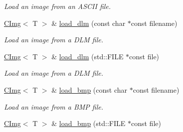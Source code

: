 \begin{DoxyCompactItemize}
\begin{DoxyCompactList}\small\item\em Load an image from an ASCII file. \item\end{DoxyCompactList}\item 
\hypertarget{structcimg__library_1_1CImg_a15505951824c019f6fdea4f0eaab8cac}{
\hyperlink{structcimg__library_1_1CImg}{CImg}$<$ T $>$ \& \hyperlink{structcimg__library_1_1CImg_a15505951824c019f6fdea4f0eaab8cac}{load\_\-dlm} (const char $\ast$const filename)}
\label{structcimg__library_1_1CImg_a15505951824c019f6fdea4f0eaab8cac}

\begin{DoxyCompactList}\small\item\em Load an image from a DLM file. \item\end{DoxyCompactList}\item 
\hypertarget{structcimg__library_1_1CImg_a29d964f1e7f6e72bd8838ea5e89e0c3e}{
\hyperlink{structcimg__library_1_1CImg}{CImg}$<$ T $>$ \& \hyperlink{structcimg__library_1_1CImg_a29d964f1e7f6e72bd8838ea5e89e0c3e}{load\_\-dlm} (std::FILE $\ast$const file)}
\label{structcimg__library_1_1CImg_a29d964f1e7f6e72bd8838ea5e89e0c3e}

\begin{DoxyCompactList}\small\item\em Load an image from a DLM file. \item\end{DoxyCompactList}\item 
\hypertarget{structcimg__library_1_1CImg_abd7e94f200f3d4bd249c32d0d9c511bc}{
\hyperlink{structcimg__library_1_1CImg}{CImg}$<$ T $>$ \& \hyperlink{structcimg__library_1_1CImg_abd7e94f200f3d4bd249c32d0d9c511bc}{load\_\-bmp} (const char $\ast$const filename)}
\label{structcimg__library_1_1CImg_abd7e94f200f3d4bd249c32d0d9c511bc}

\begin{DoxyCompactList}\small\item\em Load an image from a BMP file. \item\end{DoxyCompactList}\item 
\hypertarget{structcimg__library_1_1CImg_aad5067ceda791b6b22ac83a3ab99bf3a}{
\hyperlink{structcimg__library_1_1CImg}{CImg}$<$ T $>$ \& \hyperlink{structcimg__library_1_1CImg_aad5067ceda791b6b22ac83a3ab99bf3a}{load\_\-bmp} (std::FILE $\ast$const file)}
\label{structcimg__library_1_1CImg_aad5067ceda791b6b22ac83a3ab99bf3a}


\end{DoxyCompactItemize}
